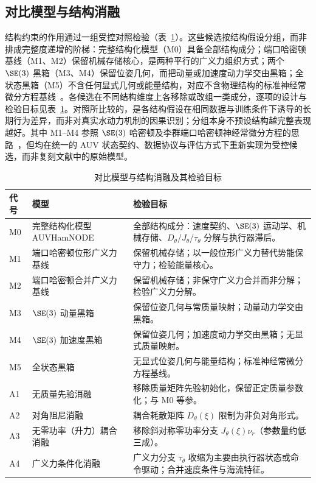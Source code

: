 \subsection{对比模型与结构消融}
\label{subsec:models-ablations}

结构约束的作用通过一组受控对照检验（表~\ref{tab:model-comparison-roles}）。这些候选按结构假设分组，而非排成完整度递增的阶梯：完整结构化模型（M0）具备全部结构成分；端口哈密顿基线（M1、M2）保留机械存储核心，是两种平行的广义力组织方式；两个 \(\SE(3)\) 黑箱（M3、M4）保留位姿几何，而把动量或加速度动力学交由黑箱；全状态黑箱（M5）不含任何显式几何或能量结构，对应不含物理结构的标准神经常微分方程基线~\citep{chen2018neuralode}。各候选在不同结构维度上各移除或改组一类成分，逐项的设计与检验目标见表~\ref{tab:model-comparison-roles}。对照所比较的，是各结构假设在相同数据与训练条件下诱导的长期行为差异，而非对真实水动力机制的因果识别；分组本身不预设结构越完整表现越好。其中 M1--M4 参照 \(\SE(3)\) 哈密顿及李群端口哈密顿神经常微分方程的思路~\citep{duong2021se3hamnode,duong2024liegroupphnode}，但均在统一的 AUV 状态契约、数据协议与评估方式下重新实现为受控候选，而非复刻文献中的原始模型。

\begin{table}[htbp]
  \centering
  \caption{对比模型与结构消融及其检验目标}
  \label{tab:model-comparison-roles}
  \begin{tabularx}{\textwidth}{l>{\raggedright\arraybackslash}p{}>{\raggedright\arraybackslash}X}
    \toprule
    代号 & 模型 & 检验目标 \\
    \midrule
    M0 & 完整结构化模型 AUVHamNODE & 全部结构成分：速度契约、\(\SE(3)\) 运动学、机械存储、\(D_\theta\)/\(J_\theta\)/\(\tau_\theta\) 分解与执行器滞后。 \\
    M1 & 端口哈密顿位形广义力基线 & 保留机械存储；以一般位形广义力替代势能保守力；检验能量核心。 \\
    M2 & 端口哈密顿合并广义力基线 & 保留机械存储；非保守广义力合并而非分解；检验广义力分解。 \\
    M3 & \(\SE(3)\) 动量黑箱 & 保留位姿几何与常质量映射；动量动力学交由黑箱。 \\
    M4 & \(\SE(3)\) 加速度黑箱 & 保留位姿几何；加速度动力学交由黑箱；无显式质量映射。 \\
    M5 & 全状态黑箱 & 无显式位姿几何与能量结构；标准神经常微分方程基线。 \\
    \midrule
    A1 & 无质量先验消融 & 移除质量矩阵先验初始化，保留正定质量参数化；与 M0 等参。 \\
    A2 & 对角阻尼消融 & 耦合耗散矩阵 \(D_\theta(\xi)\) 限制为非负对角形式。 \\
    A3 & 无零功率（升力）耦合消融 & 移除斜对称零功率分支 \(J_\theta(\xi)\nu_r\)（参数量约低三成）。 \\
    A4 & 广义力条件化消融 & 广义力分支 \(\tau_\theta\) 收缩为主要由执行器状态或命令驱动；合并速度条件与海流特征。 \\
    \bottomrule
  \end{tabularx}
\end{table}

